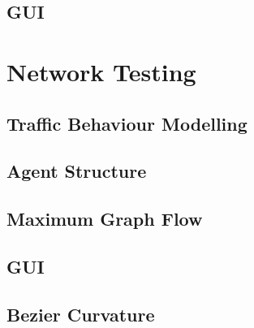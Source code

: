     \subsection{GUI}

\section{Network Testing}

    \subsection{Traffic Behaviour Modelling}

    \subsection{Agent Structure}

    \subsection{Maximum Graph Flow}

    \subsection{GUI}

    \subsection{Bezier Curvature}
